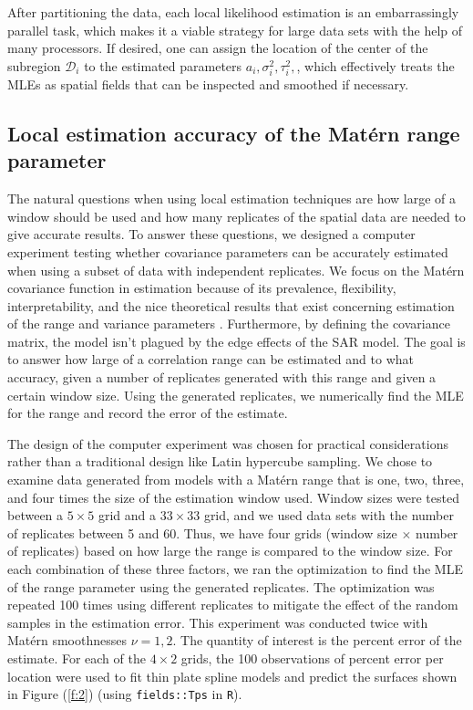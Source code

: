 \documentclass[review]{elsarticle}
\begin{document}
After partitioning the data, each local likelihood estimation is an embarrassingly parallel task, which makes it a viable strategy for large data sets with the help of many processors. If desired, one can assign the location of the center of the subregion $\mathcal{D}_i$ to the estimated parameters $a_i, \sigma_i^2, \tau_i^2,$, which effectively treats the MLEs as spatial fields that can be inspected and smoothed if necessary.


\subsection{Local estimation accuracy of the Mat\'ern range parameter}
\label{ss:2}

The natural questions when using local estimation techniques are how large of a window should be used and how many replicates of the spatial data are needed to give accurate results. To answer these questions, we designed a computer experiment testing whether covariance parameters can be accurately estimated when using a subset of data with independent replicates. We focus on the Mat\'ern covariance function in estimation because of its prevalence, flexibility, interpretability,  and the nice theoretical results that exist concerning estimation of the range and variance parameters \cite{kaufman2013role}. Furthermore, by defining the covariance matrix, the model isn't plagued by the edge effects of the SAR model. The goal is to answer how large of a correlation range can be estimated and to what accuracy, given a number of replicates generated with this range and given a certain window size. Using the generated replicates, we numerically find the MLE for the range and record the error of the estimate. 

The design of the computer experiment was chosen for practical considerations rather than a traditional design like Latin hypercube sampling. We chose to examine data generated from models with a Mat\'ern range that is one, two, three, and four times the size of the estimation window used. Window sizes were tested between a $5 \times 5$ grid and a $33 \times 33$ grid, and we used data sets with the number of replicates between 5 and 60. Thus, we have four grids (window size $\times$ number of replicates) based on how large the range is compared to the window size. For each combination of these three factors, we ran the optimization to find the MLE of the range parameter using the generated replicates. The optimization was repeated 100 times using different replicates to mitigate the effect of the random samples in the estimation error. This experiment was conducted twice with Mat\'ern smoothnesses $\nu =1, 2$. The quantity of interest is the percent error of the estimate. For each of the $4\times2$ grids, the 100 observations of percent error per location were used to fit thin plate spline models and predict the surfaces shown in Figure (\ref{f:2}) (using \texttt{fields::Tps} in \texttt{R}). 
\end{document}
